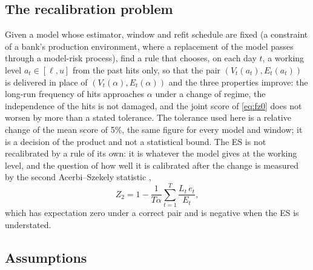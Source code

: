 \subsection{The recalibration problem}
\label{sec:problem-recal}

Given a model whose estimator, window and refit schedule are fixed (a constraint of a bank's production environment, where a replacement of the model passes through a model-risk process), find a rule that chooses, on each day $t$, a working level $a_t \in [\ell, u]$ from the past hits only, so that the pair $(V_t(a_t), E_t(a_t))$ is delivered in place of $(V_t(\alpha), E_t(\alpha))$ and the three properties improve: the long-run frequency of hits approaches $\alpha$ under a change of regime, the independence of the hits is not damaged, and the joint score of \cref{eq:fz0} does not worsen by more than a stated tolerance. The tolerance used here is a relative change of the mean score of 5\%, the same figure for every model and window; it is a decision of the product and not a statistical bound. The ES is not recalibrated by a rule of its own: it is whatever the model gives at the working level, and the question of how well it is calibrated after the change is measured by the second Acerbi--Szekely statistic \citep{acerbiszekely2014},
\begin{equation}
Z_2 = 1 - \frac{1}{T\alpha}\sum_{t=1}^{T} \frac{L_t\, e_t}{E_t},
\label{eq:z2}
\end{equation}
which has expectation zero under a correct pair and is negative when the ES is understated.

\subsection{Assumptions}
\label{sec:problem-assumptions}

